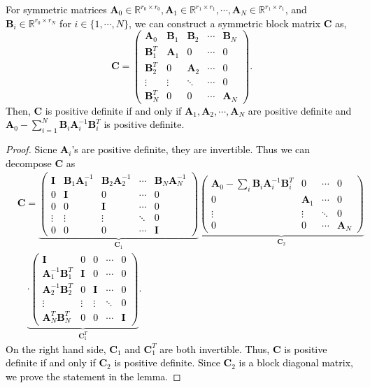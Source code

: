 \documentclass[twoside,11pt]{article}
\newcommand{\revise}[1]{\textcolor{black}{ #1}}
\newcommand{\matA}{\mathbf{A}}
\newcommand{\matB}{\mathbf{B}}
\newcommand{\matC}{\mathbf{C}}
\newcommand{\matI}{\mathbf{I}}
\begin{document}
\revise{\begin{lemma}
\label{lm:schurcomplement}
For symmetric matrices $\matA_0 \in \mathbb{R}^{r_0\times r_0}, \matA_{1}\in \mathbb{R}^{r_1\times r_1},\cdots, \matA_{N}\in \mathbb{R}^{r_1\times r_1}$, and $\matB_{i}\in \mathbb{R}^{r_0\times r_N}$ for $i\in\{1,\cdots,N\}$, we can construct a symmetric block matrix $\matC$ as,
\begin{equation}
\matC = 
\begin{pmatrix}
\matA_0   & \matB_1     & \matB_2   &\cdots & \matB_N\\
\matB_1^T & \matA_1     & 0     &\cdots & 0\\
\matB_2^T & 0       & \matA_2   &\cdots & 0\\
\vdots     &\vdots   &\ddots &\cdots & 0\\
\matB_N^T & 0       & 0     &\cdots & \matA_N
\end{pmatrix}.
\end{equation}
Then, $\matC$ is positive definite if and only if $\matA_1,\matA_2,\cdots,\matA_N$ are positive definite and $\matA_0 -\sum_{i=1}^N\matB_i\matA_i^{-1}\matB_i^T$ is positive definite. 
\end{lemma}}
\revise{\begin{proof}
Sicne $\matA_i$'s are positive definite, they are invertible. Thus we can decompose $\matC$ as
\begin{align*}
&\matC =     \underbrace{\begin{pmatrix}
\matI   & \matB_1\matA_1^{-1}     & \matB_2\matA_2^{-1}   &\cdots & \matB_N\matA_N^{-1}\\
0 & \matI     & 0     &\cdots & 0\\
0 & 0       & \matI   &\cdots & 0\\
\vdots     &\vdots   &\vdots &\ddots & 0\\
0 & 0       & 0     &\cdots & \matI
\end{pmatrix}}_{\matC_1}
\underbrace{\begin{pmatrix}
\matA_0-\sum_i\matB_i\matA_i^{-1}\matB_i^T   & 0    &\cdots & 0\\
0 & \matA_1       &\cdots & 0\\
\vdots     &\vdots   &\ddots  & 0\\
 0       & 0     &\cdots & \matA_N
\end{pmatrix}}_{\matC_2}\\
&\quad \underbrace{\cdot\begin{pmatrix}
\matI   & 0     & 0   &\cdots & 0\\
\matA_1^{-1}\matB_1^T & \matI     & 0     &\cdots & 0\\
\matA_2^{-1}\matB_2^T & 0       & \matI  &\cdots & 0\\
\vdots     &\vdots   &\vdots &\ddots & 0\\
\matA_{N}^T\matB_N^T & 0       & 0     &\cdots & \matI
\end{pmatrix}}_{\matC_1^T}.
\end{align*}
On the right hand side, $\matC_1$ and $\matC_1^T$ are both invertible. Thus, $\matC$ is positive definite if and only if $\matC_2$ is positive definite. Since $\matC_2$ is a block diagonal matrix, we prove the statement in the lemma.  
\end{proof}}
\end{document}
